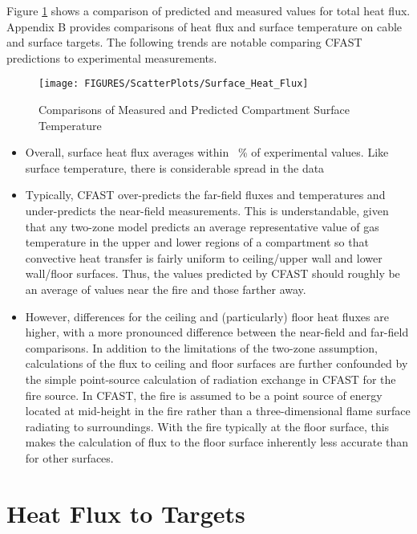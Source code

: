 Figure \ref{fig:Surface_Flux_Scatter} shows a comparison of predicted and measured values for total heat flux. Appendix B provides comparisons of heat flux and surface temperature on cable and surface targets.  The following trends are notable comparing CFAST predictions to experimental measurements.
\label{Target Heat Flux}

\begin{figure}
\begin{center}
\texttt{[image: FIGURES/ScatterPlots/Surface\_Heat\_Flux]}
\end{center}
\caption{Comparisons of Measured and Predicted Compartment Surface Temperature} \label{fig:Surface_Flux_Scatter}
\end{figure}

\begin{itemize}
\item Overall, surface heat flux averages within \Surfacefluxavg ~\% of experimental values.  Like surface temperature, there is considerable spread in the data
\item Typically, CFAST over-predicts the far-field fluxes and temperatures and under-predicts the near-field measurements.  This is understandable, given that any two-zone model predicts an average representative value of gas temperature in the upper and lower regions of a compartment so that convective heat transfer is fairly uniform to ceiling/upper wall and lower wall/floor surfaces.  Thus, the values predicted by CFAST should roughly be an average of values near the fire and those farther away.
\item However, differences for the ceiling and (particularly) floor heat fluxes are higher, with a more pronounced difference between the near-field and far-field comparisons.  In addition to the limitations of the two-zone assumption, calculations of the flux to ceiling and floor surfaces are further confounded by the simple point-source calculation of radiation exchange in CFAST for the fire source.  In CFAST, the fire is assumed to be a point source of energy located at mid-height in the fire rather than a three-dimensional flame surface radiating to surroundings.  With the fire typically at the floor surface, this makes the calculation of flux to the floor surface inherently less accurate than for other surfaces.
\end{itemize}

\section{Heat Flux to Targets}

